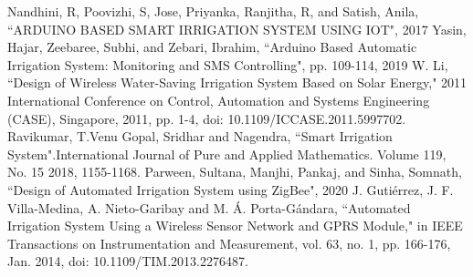 \documentclass[conference]{IEEEtran}
\begin{document}
	\begin{thebibliography}{00}
		Nandhini, R, Poovizhi, S, Jose, Priyanka, Ranjitha, R, and Satish, Anila, ``ARDUINO BASED SMART IRRIGATION SYSTEM USING IOT", 2017
		 Yasin, Hajar, Zeebaree, Subhi, and Zebari, Ibrahim, ``Arduino Based Automatic Irrigation System: Monitoring and SMS Controlling", pp. 109-114, 2019
		W. Li, ``Design of Wireless Water-Saving Irrigation System Based on Solar Energy," 2011 International Conference on Control, Automation and Systems Engineering (CASE), Singapore, 2011, pp. 1-4, doi: 10.1109/ICCASE.2011.5997702.
		Ravikumar, T.Venu Gopal, Sridhar and Nagendra, ``Smart Irrigation System".International Journal of Pure and Applied Mathematics. Volume 119, No. 15 2018, 1155-1168.
		Parween, Sultana, Manjhi, Pankaj, and Sinha, Somnath, ``Design of Automated Irrigation System using ZigBee", 2020
		J. Gutiérrez, J. F. Villa-Medina, A. Nieto-Garibay and M. Á. Porta-Gándara, ``Automated Irrigation System Using a Wireless Sensor Network and GPRS Module," in IEEE Transactions on Instrumentation and Measurement, vol. 63, no. 1, pp. 166-176, Jan. 2014, doi: 10.1109/TIM.2013.2276487.
	\end{thebibliography}
	
\end{document}
